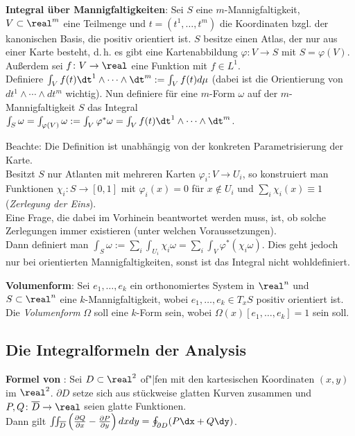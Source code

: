 \textbf{Integral über Mannigfaltigkeiten}:
Sei $S$ eine $m$-Mannigfaltigkeit, $V \subset \real^m$ eine Teilmenge und
$t = (t^1, \dotsc, t^m)$ die Koordinaten bzgl. der kanonischen Basis,
die positiv orientiert ist.
$S$ besitze einen Atlas, der nur aus einer Karte besteht, d.\,h.
es gibt eine Kartenabbildung $\varphi\colon V \rightarrow S$
mit $S = \varphi(V)$.
Außerdem sei $f\colon V \rightarrow \real$ eine Funktion mit $f \in L^1$. \\
Definiere $\int_V f(t) \dt^1 \land \dotsb \land \dt^m :=
\int_V f(t) d\mu$ (dabei ist die Orientierung von
$dt^1 \land \dotsb \land dt^m$ wichtig).
Nun definiere für eine $m$-Form $\omega$ auf der $m$-Mannigfaltigkeit $S$ das
Integral \\
$\int_S \omega = \int_{\varphi(V)} \omega := \int_V \varphi^\ast \omega =
\int_V f(t) \dt^1 \land \dotsb \land \dt^m$.

Beachte: Die Definition ist unabhängig von der konkreten Parametrisierung
der Karte. \\
Besitzt $S$ nur Atlanten mit mehreren Karten
$\varphi_i\colon V \rightarrow U_i$, so konstruiert man Funktionen
$\chi_i\colon S \rightarrow [0, 1]$ mit $\varphi_i(x) = 0$ für $x \notin U_i$
und $\sum_i \chi_i(x) \equiv 1$ (\emph{Zerlegung der Eins}). \\
Eine Frage, die dabei im Vorhinein beantwortet werden muss, ist, ob solche
Zerlegungen immer existieren (unter welchen Voraussetzungen). \\
Dann definiert man $\int_S \omega := \sum_i \int_{U_i} \chi_i \omega =
\sum_i \int_V \varphi^\ast(\chi_i \omega)$.
Dies geht jedoch nur bei orientierten Mannigfaltigkeiten, sonst ist das
Integral nicht wohldefiniert.

\linie

\textbf{Volumenform}:
Sei $e_1, \dotsc, e_k$ ein orthonomiertes System in $\real^n$ und
$S \subset \real^n$ eine $k$-Mannigfal\-tigkeit, wobei
$e_1, \dotsc, e_k \in T_x S$ positiv orientiert ist.
Die \emph{Volumenform} $\Omega$ soll eine $k$-Form sein, wobei
$\Omega(x)[e_1, \dotsc, e_k] = 1$ sein soll.

\pagebreak

\subsection{%
    Die Integralformeln der Analysis%
}

\textbf{Formel von }:
Sei $D \subset \real^2$ of"|fen mit den kartesischen Koordinaten $(x, y)$
im $\real^2$.
$\partial D$ setze sich aus stückweise glatten Kurven zusammen und
$P, Q\colon \overline{D} \rightarrow \real$ seien glatte Funktionen. \\
Dann gilt $\iint_{\overline{D}} \left(\frac{\partial Q}{\partial x} -
\frac{\partial P}{\partial y}\right) dxdy = \oint_{\partial D} (P\dx + Q\dy)$.

